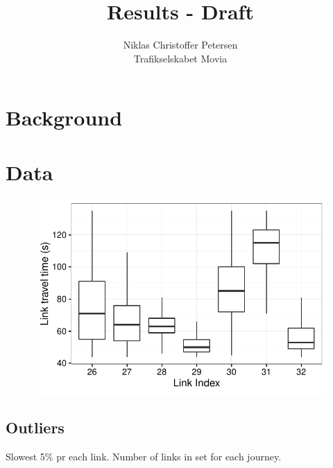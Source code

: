 \documentclass[11pt]{article}
\title{Results - Draft}
\author{Niklas Christoffer Petersen\\Trafikselskabet Movia} %
\begin{document}
\singlespace
\maketitle

\begin{abstract}                %
\end{abstract}

\onehalfspacing

\setcounter{secnumdepth}{2}

\section{Background}\label{ch:background}

\section{Data}\label{ch:data}
\begin{table}[h!]
    \center
    \footnotesize
    
\end{table}

\begin{figure}[h!]
    \center
    \includegraphics[scale=.8]{../plots/d1_loi_boxplot_nooutlier}
    \caption{}    
\end{figure}
\clearpage

\subsection{Outliers}
Slowest 5\% pr each link. Number of links in set for each journey.
\end{document}
